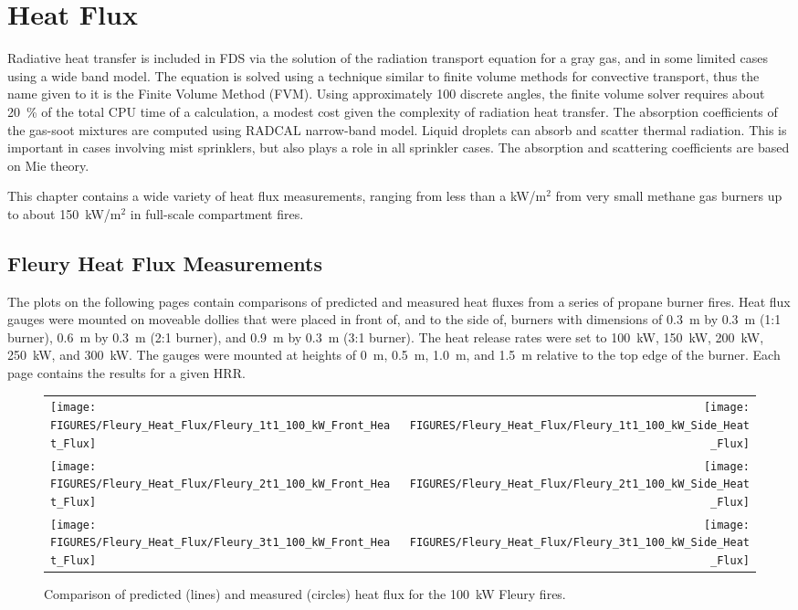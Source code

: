 \chapter{Heat Flux}

Radiative heat transfer is included in FDS via the solution of the radiation transport equation for a
gray gas, and in some limited cases using a wide band
model.  The equation is solved using a technique similar to finite
volume methods for convective transport, thus the name given to it is
the Finite Volume Method (FVM).  Using approximately 100 discrete
angles, the finite volume solver requires about 20~\% of the total CPU
time of a calculation, a modest cost given the complexity of radiation
heat transfer. The absorption coefficients of the gas-soot mixtures
are computed using RADCAL narrow-band model.  Liquid droplets can
absorb and scatter thermal radiation. This is important in cases
involving mist sprinklers, but also plays a role in all sprinkler
cases.  The absorption and scattering coefficients are based on Mie
theory.

This chapter contains a wide variety of heat flux measurements,
ranging from less than a kW/m$^2$ from very small methane gas burners
up to about 150~kW/m$^2$ in full-scale compartment fires.


\clearpage

\section{Fleury Heat Flux Measurements}

The plots on the following pages contain comparisons of predicted and measured heat fluxes from a series of propane burner fires.
Heat flux gauges were mounted on moveable dollies that
were placed in front of, and to the side of, burners with dimensions of 0.3~m by 0.3~m (1:1 burner), 0.6~m by 0.3~m (2:1 burner), and 0.9~m by 0.3~m (3:1 burner). The heat release
rates were set to 100~kW, 150~kW, 200~kW, 250~kW, and 300~kW. The gauges were mounted at heights of 0~m, 0.5~m, 1.0~m, and 1.5~m relative to the top edge of the burner. Each page
contains the results for a given HRR.



\begin{figure}[p]
\begin{tabular*}{\textwidth}{l@{\extracolsep{\fill}}r}
\texttt{[image: FIGURES/Fleury\_Heat\_Flux/Fleury\_1t1\_100\_kW\_Front\_Heat\_Flux]} &
\texttt{[image: FIGURES/Fleury\_Heat\_Flux/Fleury\_1t1\_100\_kW\_Side\_Heat\_Flux]} \\
\texttt{[image: FIGURES/Fleury\_Heat\_Flux/Fleury\_2t1\_100\_kW\_Front\_Heat\_Flux]} &
\texttt{[image: FIGURES/Fleury\_Heat\_Flux/Fleury\_2t1\_100\_kW\_Side\_Heat\_Flux]} \\
\texttt{[image: FIGURES/Fleury\_Heat\_Flux/Fleury\_3t1\_100\_kW\_Front\_Heat\_Flux]} &
\texttt{[image: FIGURES/Fleury\_Heat\_Flux/Fleury\_3t1\_100\_kW\_Side\_Heat\_Flux]}
\end{tabular*}
\label{Fleury_Heat_Flux_100_kW}
\caption[Fleury Heat Flux, 100 kW fires.]
{Comparison of predicted (lines) and measured (circles) heat flux for the 100~kW Fleury fires.}
\end{figure}

